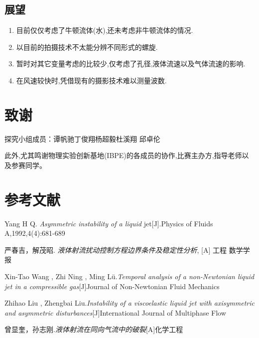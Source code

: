\documentclass[UTF8]{gapd}
\begin{document}
\subsection{展望}
\begin{enumerate}
	\item 目前仅仅考虑了牛顿流体(水),还未考虑非牛顿流体的情况.
	\item 以目前的拍摄技术不太能分辨不同形式的螺旋.
	\item 暂时对其它变量考虑的比较少,仅考虑了孔径,液体流速以及气体流速的影响.
	\item 在风速较快时,凭借现有的摄影技术难以测量波数.
\end{enumerate}      
\section*{致谢}
探究小组成员：谭帆驰\quad  丁俊翔\quad  杨超毅\quad  杜溪翔 \quad 邱卓伦  

此外,尤其鸣谢物理实验创新基地(IBPE)的各成员的协作,比赛主办方,指导老师以及参赛同学。



\section*{参考文献}
\begin{thebibliography}{2}

Yang H Q.
\textit{Asymmetric instability of a liquid }jet[J].Physics of Fluids A,1992,4(4):681-689 

严春吉，解茂昭. \textit{液体射流扰动控制方程边界条件及稳定性分析}, [A] 工程 数学学报 

 Xin-Tao Wang , Zhi Ning , Ming Lü.\textit{Temporal analysis of a non-Newtonian liquid jet in a compressible gas}[J]Journal of Non-Newtonian Fluid Mechanics 

Zhihao Liu , Zhengbai Liu.\textit{Instability of a viscoelastic liquid jet with axisymmetric and asymmetric disturbances}[J]International Journal of Multiphase Flow

曾显奎，孙志刚.\textit{液体射流在同向气流中的破裂}[A]化学工程
\end{thebibliography}
\end{document}
